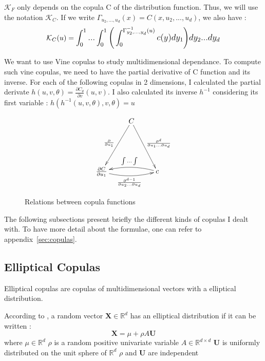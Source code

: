 \documentclass{article}
\begin{document}
	$\mathcal{K}_F$ only depends on the copula C of the distribution function.\newline
	Thus, we will use the notation $\mathcal{K}_C$. \newline
	If we write $\Gamma_{u_2,...,u_{d}}(x) = C(x,u_2,...,u_d)$, we also have :
	\begin{equation*}
	\mathcal{K}_C (u) = \mathlarger{ \int_0^1 ... \int_0^1 \bigg(\int_0^{\Gamma_{y_2,...,y_{d}}^{-1}(u)} c(y) dy_1 \bigg) dy_2...dy_d}
	\end{equation*}
	\newline
	
	
	We want to use Vine copulas to study multidimensional dependance. To compute such vine copulas, we need to have the partial derivative of C function and its inverse. For each of the following copulas in 2 dimensions, I calculated the partial derivate \begin{math} h(u,v,\theta) = \frac{\partial C_{\theta}}{\partial v} (u,v) \end{math}. I also calculated its inverse \begin{math} h^{-1} \end{math} considering its first variable : \begin{math} h(h^{-1}(u,v,\theta),v,\theta)=u \end{math}
	
	
	\begin{figure}
	\[
   	\xymatrix{
   		 & C \ar[ldd]_{\frac{\partial}{\partial u_{1}}} \ar[rdd]^{\frac{\partial^d}{\partial u_{1} ... \partial u_{d}}} & \\
   		 & & \\
   		\frac{\partial C}{\partial u_{1}} \ar@/_/[rr]_{\frac{\partial^{d-1}}{\partial u_{2} ... \partial u_{d}}} & & c \ar@/_/[ll]_{\int ... \int}
   	}
   \]
	\caption{Relations between copula functions}
	\end{figure}	   
   
   
   \newpage
   The following subsections present briefly the different kinds of copulas I dealt with. To have more detail about the formulae, one can refer to appendix~\ref{sec:copulas}.
   \subsection{Elliptical Copulas}
   Elliptical copulas are copulas of multidimensional vectors with a elliptical distribution.
   \begin{definition}
   According to \cite{ellipticalcopula}, a random vector $\mathbf{X} \in \mathbb{R}^d$ has an elliptical distribution if it can be written :
   \begin{equation*}
   \mathbf{X} = \mu + \rho A \mathbf{U}
   \end{equation*}
   where $\mu \in \mathbb{R}^d$\newline
   $\rho$ is a random positive univariate variable \newline
   $A \in \mathbb{R}^{d\times d}$ \newline
   $\mathbf{U}$ is uniformly distributed on the unit sphere of $\mathbb{R}^d$ \newline
   $\rho$ and $\mathbf{U}$ are independent 
   \end{definition}
   
\end{document}
